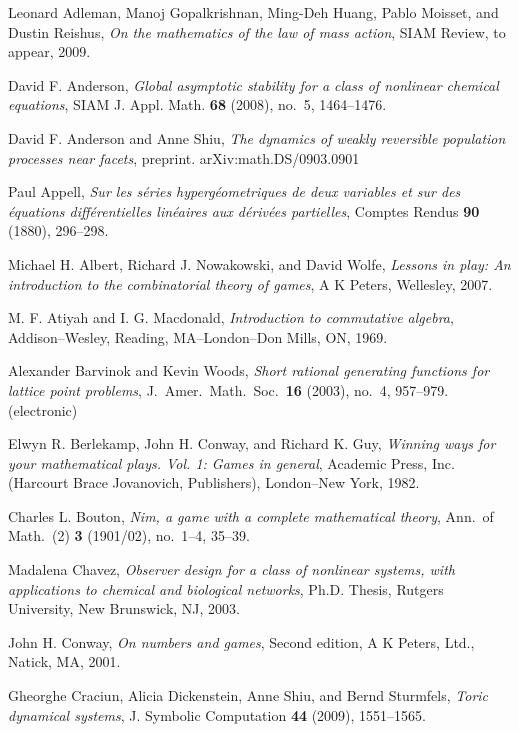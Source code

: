 \documentclass[12pt]{amsart}
\numberwithin{equation}{section}
\theoremstyle{definition}
\begin{document}
\raggedbottom
{}
Leonard Adleman, Manoj Gopalkrishnan, Ming-Deh Huang, Pablo Moisset,
  and Dustin Reishus, \emph{On the mathematics of the law of mass
  action}, SIAM Review, to appear, 2009.

David F. Anderson, \emph{Global asymptotic stability for a class of
  nonlinear chemical equations}, SIAM J. Appl. Math. \textbf{68}
  (2008), no.~5, 1464--1476.

David F. Anderson and Anne Shiu, \emph{The dynamics of weakly
  reversible population processes near facets}, preprint.
  \textsf{arXiv:math.DS/0903.0901}

Paul Appell, \emph{Sur les s\'eries hyperg\'eometriques de deux
  variables et sur des \'equations diff\'erentielles lin\'eaires aux
  d\'eriv\'ees partielles}, Comptes Rendus \textbf{90} (1880),
  296--298.

Michael H. Albert, Richard J. Nowakowski, and David Wolfe,
  \emph{Lessons in play: An introduction to the combinatorial theory
  of games}, A K Peters, Wellesley, 2007.

M. F. Atiyah and I. G. Macdonald,
\emph{Introduction to commutative algebra}, Addison--Wesley,
Reading, MA--London--Don Mills, ON, 1969.

Alexander Barvinok and Kevin Woods, \textit{Short rational generating
  functions for lattice point problems}, J.\ Amer.\ Math.\
  Soc.~\textbf{16} (2003), no.~4, 957--979.  (electronic)

Elwyn R. Berlekamp, John H. Conway, and Richard K. Guy, \emph{Winning
  ways for your mathematical plays. Vol. 1: Games in general},
  Academic Press, Inc. (Harcourt Brace Jovanovich, Publishers),
  London--New York, 1982.

Charles L. Bouton, \textit{Nim, a game with a complete mathematical
  theory}, Ann.\ of Math.\ (2) \textbf{3} (1901/02), no.~1--4, 35--39.

Madalena Chavez, \emph{Observer design for a class of nonlinear
  systems, with applications to chemical and biological networks},
  Ph.D. Thesis, Rutgers University, New Brunswick, NJ, 2003.

John H. Conway, \textit{On numbers and games}, Second edition,  A K
  Peters, Ltd., Natick, MA, 2001.

Gheorghe Craciun, Alicia Dickenstein, Anne Shiu, and Bernd Sturmfels,
  \emph{Toric dynamical systems}, J. Symbolic Computation \textbf{44}
  (2009), 1551--1565.
\end{document}
